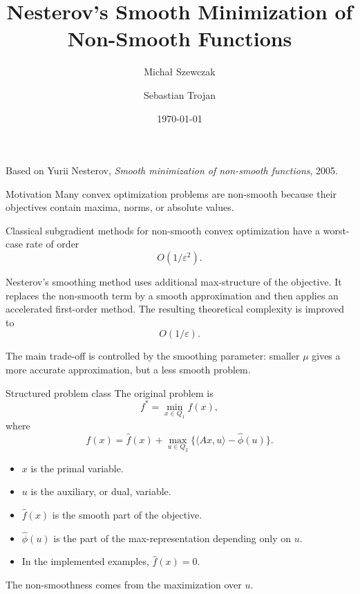 \documentclass[aspectratio=169]{beamer}
\title[Nesterov smoothing]{Nesterov's Smooth Minimization of Non-Smooth Functions}
\author{Micha\l{} Szewczak \and Sebastian Trojan}
\date{\today}
\begin{document}
\begin{frame}
  \titlepage
  \vspace{-1em}
  \begin{center}
    \small Based on Yurii Nesterov, \emph{Smooth minimization of non-smooth functions}, 2005.
  \end{center}
\end{frame}

\begin{frame}{Motivation}
  Many convex optimization problems are non-smooth because their objectives contain maxima, norms, or absolute values.

  \vspace{0.6em}
  Classical subgradient methods for non-smooth convex optimization have a worst-case rate of order
  \[
      O(1/\varepsilon^2).
  \]

  Nesterov's smoothing method uses additional max-structure of the objective. It replaces the non-smooth term by a smooth approximation and then applies an accelerated first-order method.
  The resulting theoretical complexity is improved to
  \[
      O(1/\varepsilon).
  \]

  \vspace{0.3em}
  The main trade-off is controlled by the smoothing parameter: smaller $\mu$ gives a more accurate approximation, but a less smooth problem.
\end{frame}

\begin{frame}{Structured problem class}
  The original problem is
  \[
      f^*=\min_{x\in Q_1}f(x),
  \]
  where
  \[
      f(x)=\hat f(x)+\max_{u\in Q_2}
      \{\langle Ax,u\rangle-\hat\phi(u)\}.
  \]

  \vspace{0.5em}
  \begin{itemize}
    \item $x$ is the primal variable.
    \item $u$ is the auxiliary, or dual, variable.
    \item $\hat f(x)$ is the smooth part of the objective.
    \item $\hat\phi(u)$ is the part of the max-representation depending only on $u$.
    \item In the implemented examples, $\hat f(x)=0$.
  \end{itemize}

  \vspace{0.3em}
  The non-smoothness comes from the maximization over $u$.
\end{frame}
\end{document}
